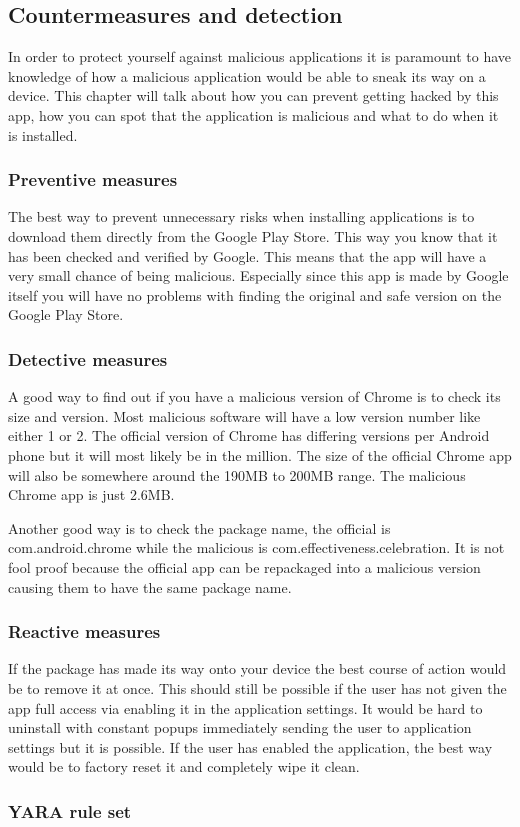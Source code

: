\subsection{Countermeasures and detection}

In order to protect yourself against malicious applications it is paramount to have knowledge of how a malicious application would be able to sneak its way on a device. 
This chapter will talk about how you can prevent getting hacked by this app, how you can spot that the application is malicious and what to do when it is installed.

\subsubsection{Preventive measures}

The best way to prevent unnecessary risks when installing applications is to download them directly from the Google Play Store. 
This way you know that it has been checked and verified by Google. 
This means that the app will have a very small chance of being malicious. 
Especially since this app is made by Google itself you will have no problems with finding the original and safe version on the Google Play Store.

\subsubsection{Detective measures}

A good way to find out if you have a malicious version of Chrome is to check its size and version. 
Most malicious software will have a low version number like either 1 or 2. 
The official version of Chrome has differing versions per Android phone but it will most likely be in the million. 
The size of the official Chrome app will also be somewhere around the 190MB to 200MB range. The malicious Chrome app is just 2.6MB. 

Another good way is to check the package name, the official is com.android.chrome while the malicious is com.effectiveness.celebration. 
It is not fool proof because the official app can be repackaged into a malicious version causing them to have the same package name.

\subsubsection{Reactive measures}

If the package has made its way onto your device the best course of action would be to remove it at once. 
This should still be possible if the user has not given the app full access via enabling it in the application settings. 
It would be hard to uninstall with constant popups immediately sending the user to application settings but it is possible. 
If the user has enabled the application, the best way would be to factory reset it and completely wipe it clean.

\newpage
\subsubsection{YARA rule set}

